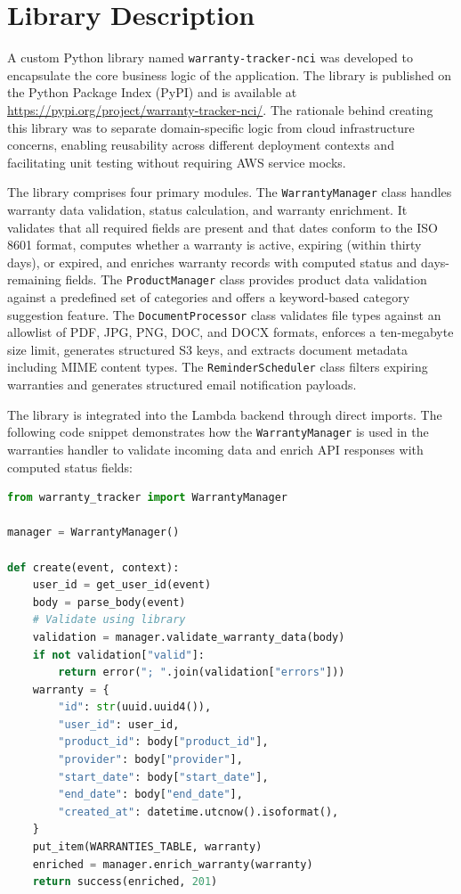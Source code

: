 \documentclass[conference]{IEEEtran}
\begin{document}
\section{Library Description}

A custom Python library named \texttt{warranty-tracker-nci} was developed to encapsulate the core business logic of the application. The library is published on the Python Package Index (PyPI) and is available at \url{https://pypi.org/project/warranty-tracker-nci/}. The rationale behind creating this library was to separate domain-specific logic from cloud infrastructure concerns, enabling reusability across different deployment contexts and facilitating unit testing without requiring AWS service mocks.

The library comprises four primary modules. The \texttt{WarrantyManager} class handles warranty data validation, status calculation, and warranty enrichment. It validates that all required fields are present and that dates conform to the ISO 8601 format, computes whether a warranty is active, expiring (within thirty days), or expired, and enriches warranty records with computed status and days-remaining fields. The \texttt{ProductManager} class provides product data validation against a predefined set of categories and offers a keyword-based category suggestion feature. The \texttt{DocumentProcessor} class validates file types against an allowlist of PDF, JPG, PNG, DOC, and DOCX formats, enforces a ten-megabyte size limit, generates structured S3 keys, and extracts document metadata including MIME content types. The \texttt{ReminderScheduler} class filters expiring warranties and generates structured email notification payloads.

The library is integrated into the Lambda backend through direct imports. The following code snippet demonstrates how the \texttt{WarrantyManager} is used in the warranties handler to validate incoming data and enrich API responses with computed status fields:

\begin{lstlisting}[language=Python, caption={Usage of WarrantyManager in Lambda handler}]
from warranty_tracker import WarrantyManager

manager = WarrantyManager()

def create(event, context):
    user_id = get_user_id(event)
    body = parse_body(event)
    # Validate using library
    validation = manager.validate_warranty_data(body)
    if not validation["valid"]:
        return error("; ".join(validation["errors"]))
    warranty = {
        "id": str(uuid.uuid4()),
        "user_id": user_id,
        "product_id": body["product_id"],
        "provider": body["provider"],
        "start_date": body["start_date"],
        "end_date": body["end_date"],
        "created_at": datetime.utcnow().isoformat(),
    }
    put_item(WARRANTIES_TABLE, warranty)
    enriched = manager.enrich_warranty(warranty)
    return success(enriched, 201)
\end{lstlisting}
\end{document}
